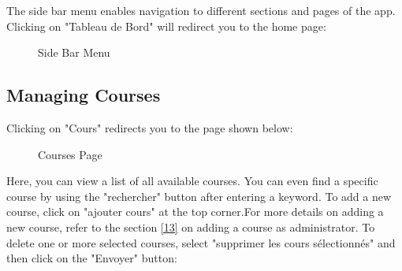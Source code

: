 \documentclass[12pt]{article}
\begin{document}
The side bar menu enables navigation to different sections and pages of the app. Clicking on "Tableau de Bord" will redirect you to the home page:

\begin{figure}[H]
    \centering
    \caption{Side Bar Menu}
\end{figure}

\subsection{Managing Courses}

Clicking on "Cours" redirects you to the page shown below:

\begin{figure}[H]
    \centering
    \caption{Courses Page}
\end{figure}

Here, you can view a list of all available courses. You can even find a specific course by using the "rechercher" button after entering a keyword. To add a new course, click on "ajouter cours" at the top corner.For more details on adding a new course, refer to the section \textcolor{blue}{\ref{13}} on adding a course as administrator. To delete one or more selected courses, select "supprimer les cours sélectionnés" and then click on the "Envoyer" button:
\end{document}
